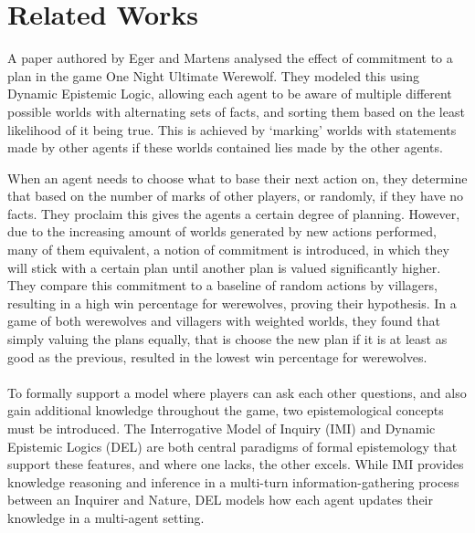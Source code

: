 \section{Related Works}
A paper authored by Eger and Martens\cite{commitment} analysed the effect of
commitment to a plan in the game One Night Ultimate Werewolf. They modeled this
using Dynamic Epistemic Logic, allowing each agent to be aware of multiple
different possible worlds with alternating sets of facts, and sorting them
based on the least likelihood of it being true. This is achieved by ‘marking’
worlds with statements made by other agents if these worlds contained lies made
by the other agents.

When an agent needs to choose what to base their next action on, they determine
that based on the number of marks of other players, or randomly, if they have
no facts. They proclaim this gives the agents a certain degree of planning.
However, due to the increasing amount of worlds generated by new actions
performed, many of them equivalent, a notion of commitment is introduced, in
which they will stick with a certain plan until another plan is valued
significantly higher. They compare this commitment to a baseline of random
actions by villagers, resulting in a high win percentage for werewolves,
proving their hypothesis. In a game of both werewolves and villagers with
weighted worlds, they found that simply valuing the plans equally, that is
choose the new plan if it is at least as good as the previous, resulted in the
lowest win percentage for werewolves.\\ \\ To formally support a model where
players can ask each other questions, and also gain additional knowledge
throughout the game, two epistemological concepts must be introduced. The
Interrogative Model of Inquiry (IMI) and Dynamic Epistemic Logics (DEL) are
both central paradigms of formal epistemology that support these features, and
where one lacks, the other excels. While IMI provides knowledge reasoning and
inference in a multi-turn information-gathering process between an Inquirer and
Nature, DEL models how each agent updates their knowledge in a multi-agent
setting.

